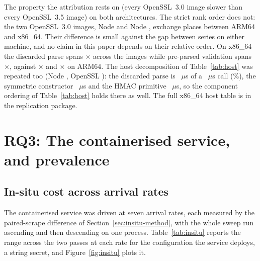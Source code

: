 \documentclass[preprint,12pt,authoryear]{elsarticle}
\begin{document}
The property the attribution rests on (every OpenSSL~3.0 image slower than
every OpenSSL~3.5 image) \XmSeriesSplitHolds{} on both architectures. The
strict rank order does not: the two OpenSSL~3.0 images, Node
\NodeEighteenNodeMajor{} and Node \NodeTwentyNodeMajor, exchange places between
ARM64 and x86\_64. Their difference is small against the gap between series on
either machine, and no claim in this paper depends on their relative order. On x86\_64 the discarded parse spans
\XmSpanProbeThrows$\times$ across the images while pre-parsed validation spans
\XmSpanJwtPreparsed$\times$, against \SpanProbeThrows$\times$ and
\SpanJwtPreparsed$\times$ on ARM64. The host decomposition of
Table~\ref{tab:host} was repeated too (Node \XhNode, OpenSSL \XhOpenssl): the
discarded parse is \XhProbeThrows~$\mu$s of a \XhJwtString~$\mu$s call
(\XhProbeShareOfCall\%), the symmetric constructor \XhCreateSecretKey~$\mu$s
and the HMAC primitive \XhHmacString~$\mu$s, so the component ordering of
Table~\ref{tab:host} holds there as well. The full x86\_64 host table is in the
replication package.

\section{RQ3: The containerised service, and prevalence}\label{sec:rq3}

\subsection{In-situ cost across arrival rates}\label{sec:insitu}

The containerised service was driven at seven arrival rates, each measured by the
paired-scrape difference of Section~\ref{sec:insitu-method}, with the whole sweep
run ascending and then descending on one process. Table~\ref{tab:insitu} reports
the range across the two passes at each rate for the configuration the service
deploys, a string secret, and Figure~\ref{fig:insitu} plots it.
\end{document}
